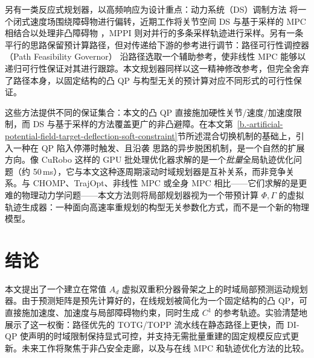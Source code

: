 另有一类反应式规划器，以高频响应为设计重点：动力系统（DS）调制方法 \cite{khansari2012} 将一个闭式速度场围绕障碍物进行偏转，近期工作将关节空间 DS 与基于采样的 MPC 相结合以处理非凸障碍物 \cite{koptev2024}，MPPI \cite{williams2017} 则对并行的多条采样轨迹进行采样。另有一条平行的思路保留预计算路径，但对传递给下游的参考进行调节：路径可行性调控器（Path Feasibility Governor）\cite{pathfg} 沿路径选取一个辅助参考，使非线性 MPC 能够以递归可行性保证对其进行跟踪。本文规划器同样以这一精神修改参考，但完全舍弃了路径本身，以固定结构的凸 QP 与构型无关的预计算对应不同形式的可行性保证。

这些方法提供不同的保证集合：本文的凸 QP 直接施加硬性关节/速度/加速度限制，而 DS 与基于采样的方法覆盖更广的非凸避障。在本文第~\ref{b.-artificial-potential-field-target-deflection-soft-constraint}节所述混合切换机制的基础上，引入一种在 QP 陷入停滞时触发、且沿袭 \cite{koptev2024} 思路的异步脱困机制，是一个自然的扩展方向。像 CuRobo \cite{curobo2023} 这样的 GPU 批处理优化器求解的是一个\emph{批量}全局轨迹优化问题（约 50\,ms），它与本文这种逐周期滚动时域规划器是互补关系，而非竞争关系。与 CHOMP、TrajOpt、非线性 MPC 或全身 MPC \cite{sleiman2021} 相比——它们求解的是更难的物理动力学问题——本文方法则将局部规划器视为一个带预计算 \(\Phi,\Gamma\) 的虚拟轨迹生成器：一种面向高速率重规划的构型无关参数化方式，而不是一个新的物理模型。



\section{结论}\label{ix.-conclusion}

本文提出了一个建立在常值 \(A_d\) 虚拟双重积分器骨架之上的时域局部预测运动规划器。由于预测矩阵是预先计算好的，在线规划被简化为一个固定结构的凸 QP，可直接施加速度、加速度与局部障碍物约束，同时生成 \(C^1\) 的参考轨迹。实验清楚地展示了这一权衡：路径优先的 TOTG/TOPP 流水线在静态路径上更快，而 DI-QP 使声明的时域限制保持显式可控，并支持无需批量重建的固定规模反应式更新。未来工作将聚焦于非凸安全走廊，以及与在线 MPC 和轨迹优化方法的比较。

